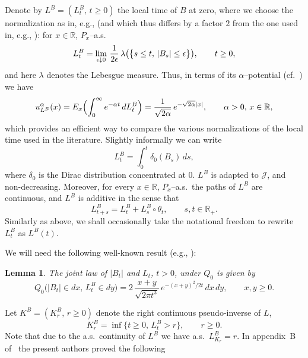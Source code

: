 \documentclass[11pt,a4paper]{amsart}
\newcommand{\ga}{\alpha}
\newcommand{\gd}{\delta}
\newcommand{\gep}{\epsilon}
\newcommand{\gl}{\lambda}
\newcommand{\cJ}{\mathcal{J}}
\newcommand{\1}{1}
\newcommand{\R}{\mathbb{R}}
\newtheorem{lemma}[theorem]{Lemma}
\theoremstyle{remark}
\let\comp\circ
\newcommand{\da}{\ensuremath\downarrow}
\numberwithin{equation}{section}
\begin{document}
Denote by $L^B=(L^B_t,\,t\ge 0)$ the local time of $B$ at zero, where we choose the
normalization as in, e.g., \cite{ReYo91} (and which thus differs by a factor $2$  from
the one used in, e.g., \cite{IkWa89, KaSh91}): for $x\in\R$, $P_x$--a.s.\
\begin{equation}    \label{eq1.7}
    L^B_t = \lim_{\gep\da 0}\,\frac{1}{2\gep}\,
            \gl\bigl(\bigl\{s\le t,\,|B_s|\le \gep\bigr\}\bigr), \qquad t\ge 0,
\end{equation}
and here $\gl$ denotes the Lebesgue measure. Thus, in terms of its $\ga$--potential
(cf.~\cite[Theorem~V.3.13]{BlGe68}) we have
\begin{equation}    \label{eq1.7a}
    u^\ga_{L^B}(x)
        = E_x\Bigl(\int_0^\infty e^{-\ga t}\,dL^B_t\Bigr)
        = \frac{1}{\sqrt{2\ga}}\,e^{-\sqrt{2\ga}|x|},\qquad \ga>0,\,x\in\R,
\end{equation}
which provides an efficient way to compare the various normalizations of the local time
used in the literature. Slightly informally we can write
\begin{equation}    \label{eq1.8}
    L^B_t = \int_0^t \gd_0(B_s)\,ds,
\end{equation}
where $\gd_0$ is the Dirac distribution concentrated at $0$. $L^B$ is adapted to $\cJ$,
and non-decreasing. Moreover, for every $x\in\R$, $P_x$--a.s.\ the paths of $L^B$ are
continuous, and $L^B$ is additive in the sense that
\begin{equation}    \label{eq1.9}
    L^B_{t+s} = L^B_t + L^B_s\comp\theta_t,\qquad s,t\in\R_+.
\end{equation}
Similarly as above, we shall occasionally take the notational freedom to rewrite
$L^B_t$ as $L^B(t)$.

We will need the following well-known result (e.g., \cite[Section~2.2,
Problem~3]{ItMc74}):

\begin{lemma}   \label{lem1.1}
The joint law of $|B_t|$ and $L_t$, $t>0$,  under $Q_0$ is given by
\begin{equation}    \label{eq1.10}
    Q_0\bigl(|B_t|\in dx,\,L^B_t\in dy\bigr)
        = 2\,\frac{x+y}{\sqrt{2\pi t^3}}\,e^{-(x+y)^2/2t}\,dx\,dy,\qquad x,y\ge 0.
\end{equation}
\end{lemma}

Let $K^B = (K^B_r,\,r\ge 0)$ denote the right continuous pseudo-inverse of $L$,
\begin{equation}    \label{eq1.11}
    K^B_r = \inf\bigl\{t\ge 0,\,L^B_t>r\bigr\},\qquad r\ge 0.
\end{equation}
Note that due to the a.s.\ continuity of $L^B$ we have a.s.\ $L^B_{K_r} = r$. In
appendix~B of~\cite{BMMG0} the present authors proved the following
\end{document}
